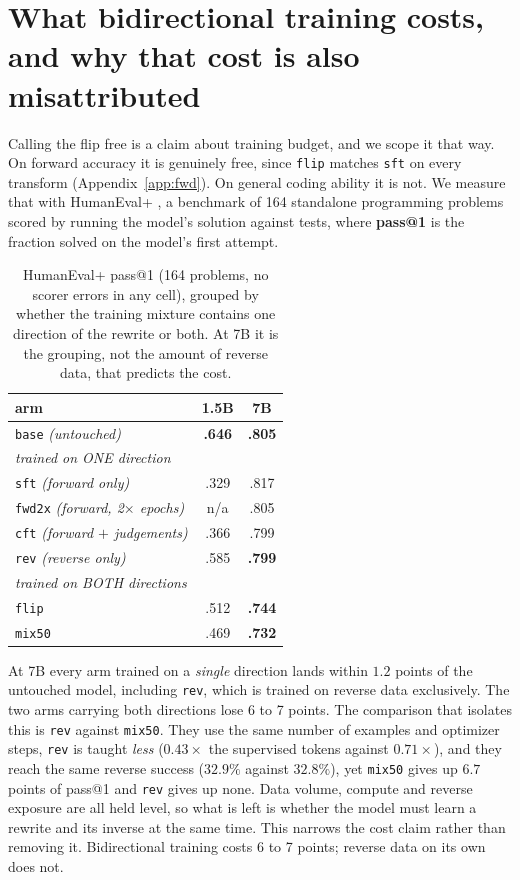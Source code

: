 \documentclass{article}
\newcommand{\arm}[1]{\texttt{#1}}
\begin{document}
\section{What bidirectional training costs, and why that cost is also misattributed}
\label{sec:cost}

Calling the flip free is a claim about training budget, and we scope it that way. On
forward accuracy it is genuinely free, since \arm{flip} matches \arm{sft} on every transform
(Appendix~\ref{app:fwd}). On general coding ability it is not. We measure that with
HumanEval+ \citep{liu2023evalplus}, a benchmark of 164 standalone programming problems
scored by running the model's solution against tests, where \textbf{pass@1} is the fraction
solved on the model's first attempt.

\begin{table}[t]
\centering\small
\caption{HumanEval+ pass@1 (164 problems, no scorer errors in any cell), grouped by whether
the training mixture contains one direction of the rewrite or both. At 7B it is the
grouping, not the amount of reverse data, that predicts the cost.}
\label{tab:humaneval}
\begin{tabular}{lcc}
\toprule
arm & 1.5B & 7B \\
\midrule
\arm{base} \emph{(untouched)} & \textbf{.646} & \textbf{.805} \\
\midrule
\multicolumn{3}{l}{\emph{trained on ONE direction}} \\
\quad\arm{sft} \emph{(forward only)} & .329 & .817 \\
\quad\arm{fwd2x} \emph{(forward, 2$\times$ epochs)} & n/a & .805 \\
\quad\arm{cft} \emph{(forward $+$ judgements)} & .366 & .799 \\
\quad\arm{rev} \emph{(reverse only)} & .585 & \textbf{.799} \\
\midrule
\multicolumn{3}{l}{\emph{trained on BOTH directions}} \\
\quad\arm{flip} & .512 & \textbf{.744} \\
\quad\arm{mix50} & .469 & \textbf{.732} \\
\bottomrule
\end{tabular}
\end{table}

At 7B every arm trained on a \emph{single} direction lands within $1.2$ points of the
untouched model, including \arm{rev}, which is trained on reverse data exclusively. The two
arms carrying both directions lose 6 to 7 points. The comparison that isolates this is
\arm{rev} against \arm{mix50}. They use the same number of examples and optimizer steps,
\arm{rev} is taught \emph{less} ($0.43\times$ the supervised tokens against $0.71\times$),
and they reach the same reverse success ($32.9\%$ against $32.8\%$), yet \arm{mix50} gives
up $6.7$ points of pass@1 and \arm{rev} gives up none. Data volume, compute and reverse
exposure are all held level, so what is left is whether the model must learn a rewrite and
its inverse at the same time. This narrows the cost claim rather than removing it.
Bidirectional training costs 6 to 7 points; reverse data on its own does not.
\end{document}
